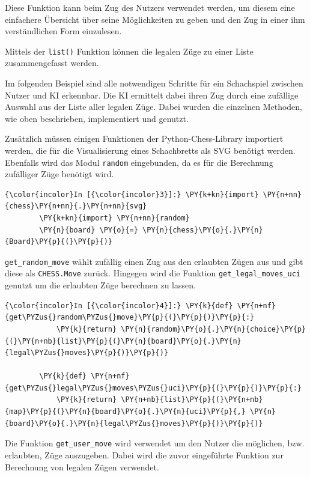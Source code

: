 Diese Funktion kann beim Zug des Nutzers verwendet werden, um diesem
eine einfachere Übersicht über seine Möglichkeiten zu geben und den Zug
in einer ihm verständlichen Form einzulesen.

Mittels der \texttt{list()} Funktion können die legalen Züge zu einer
Liste zusammengefasst werden.

Im folgenden Beispiel sind alle notwendigen Schritte für ein Schachspiel
zwischen Nutzer und KI erkennbar. Die KI ermittelt dabei ihren Zug durch
eine zufällige Auswahl aus der Liste aller legalen Züge. Dabei wurden
die einzelnen Methoden, wie oben beschrieben, implementiert und genutzt.

Zusätzlich müssen einigen Funktionen der Python-Chess-Library importiert
werden, die für die Visualisierung eines Schachbretts als SVG benötigt
werden. Ebenfalls wird das Modul \texttt{random} eingebunden, da es für
die Berechnung zufälliger Züge benötigt wird.

    \begin{Verbatim}[commandchars=\\\{\}]
{\color{incolor}In [{\color{incolor}3}]:} \PY{k+kn}{import} \PY{n+nn}{chess}\PY{n+nn}{.}\PY{n+nn}{svg}
        \PY{k+kn}{import} \PY{n+nn}{random}
        \PY{n}{board} \PY{o}{=} \PY{n}{chess}\PY{o}{.}\PY{n}{Board}\PY{p}{(}\PY{p}{)}
\end{Verbatim}


    \texttt{get\_random\_move} wählt zufällig einen Zug aus den erlaubten
Zügen aus und gibt diese als \texttt{CHESS.Move} zurück. Hingegen wird
die Funktion \texttt{get\_legal\_moves\_uci} genutzt um die erlaubten
Züge berechnen zu lassen.

    \begin{Verbatim}[commandchars=\\\{\}]
{\color{incolor}In [{\color{incolor}4}]:} \PY{k}{def} \PY{n+nf}{get\PYZus{}random\PYZus{}move}\PY{p}{(}\PY{p}{)}\PY{p}{:}
            \PY{k}{return} \PY{n}{random}\PY{o}{.}\PY{n}{choice}\PY{p}{(}\PY{n+nb}{list}\PY{p}{(}\PY{n}{board}\PY{o}{.}\PY{n}{legal\PYZus{}moves}\PY{p}{)}\PY{p}{)}
        
        \PY{k}{def} \PY{n+nf}{get\PYZus{}legal\PYZus{}moves\PYZus{}uci}\PY{p}{(}\PY{p}{)}\PY{p}{:}
            \PY{k}{return} \PY{n+nb}{list}\PY{p}{(}\PY{n+nb}{map}\PY{p}{(}\PY{n}{board}\PY{o}{.}\PY{n}{uci}\PY{p}{,} \PY{n}{board}\PY{o}{.}\PY{n}{legal\PYZus{}moves}\PY{p}{)}\PY{p}{)}
\end{Verbatim}


    Die Funktion \texttt{get\_user\_move} wird verwendet um den Nutzer die
möglichen, bzw. erlaubten, Züge auszugeben. Dabei wird die zuvor
eingeführte Funktion zur Berechnung von legalen Zügen verwendet.

